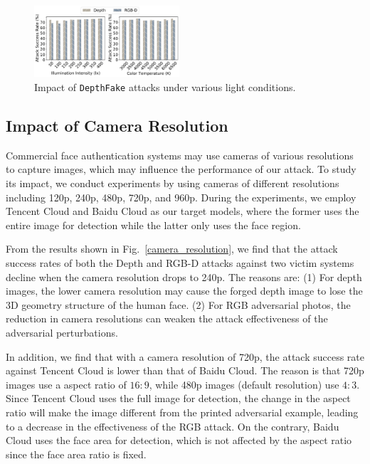 \begin{figure}[pt]
	\centerline{\includegraphics[width = 0.48\textwidth]{figures/light_condition.pdf}}
	\vspace{-0.15in}
	\caption{Impact of \texttt{DepthFake} attacks under various light conditions.}
	\label{light_condition}
	\vspace{-0.1in}
\end{figure}



\subsection{Impact of Camera Resolution} 

Commercial face authentication systems may use cameras of various resolutions to capture images, which may influence the performance of our attack. To study its impact, we conduct experiments by using cameras of different resolutions including 120p, 240p, 480p, 720p, and 960p. During the experiments, we employ Tencent Cloud and Baidu Cloud as our target models, where the former uses the entire image for detection while the latter only uses the face region. 

From the results shown in Fig.~\ref{camera_resolution},  we find that the attack success rates of both the Depth and RGB-D attacks against two victim systems decline  when the camera resolution drops to 240p. The reasons are: 
(1) For depth images, the lower camera resolution may cause the forged depth image to lose the 3D geometry structure of the human face.
(2) For RGB adversarial photos, the reduction in camera resolutions can weaken the attack effectiveness of the adversarial perturbations. 

In addition, we find that with a camera resolution of 720p, the attack success rate against Tencent Cloud is lower than that of Baidu Cloud. The reason is that 720p images use a aspect ratio of $16:9$, while 480p images (default resolution) use $4:3$. Since Tencent Cloud uses the full image  for detection, the change in the aspect ratio will make the image different from the printed adversarial example, leading to a decrease in the effectiveness of the RGB attack. On the contrary, Baidu Cloud uses the face area for detection, which is not affected by the aspect ratio since the face area ratio is fixed.

